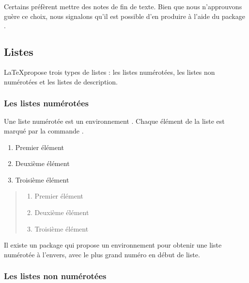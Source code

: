 \begin{plusloins}
    Certains préfèrent mettre des notes de fin de texte. Bien que nous n'approuvons guère ce choix, nous signalons qu'il est possible d'en produire à l'aide du package .
\end{plusloins}

\subsection{Listes}

\LaTeX propose trois types de listes : les listes numérotées, les listes non numérotées et les listes de description.

\subsubsection{Les listes numérotées}

Une liste numérotée est un environnement .
Chaque élément de la liste est marqué par la commande .

\begin{latexcode}
\begin{enumerate}
    \item Premier élément
    \item Deuxième élément
    \item Troisième élément
\end{enumerate}
\end{latexcode}

\begin{quotation}
\noindent\begin{enumerate}
    \item Premier élément
    \item Deuxième élément
    \item Troisième élément
\end{enumerate}
\end{quotation}

\begin{plusloins}
Il existe un package  qui propose un environnement   pour obtenir une liste numérotée à l'envers, avec le plus grand numéro en début de liste.

\end{plusloins}
\subsubsection{Les listes non numérotées}

